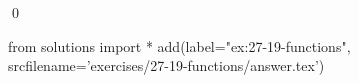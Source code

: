 
\begin{ex}
  \label{ex:27-19-functions}
  
  \qed
\end{ex}
\begin{python0}
from solutions import *
add(label="ex:27-19-functions",
    srcfilename='exercises/27-19-functions/answer.tex')
\end{python0}

